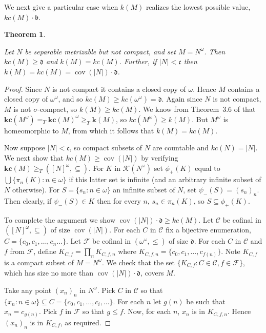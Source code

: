 \documentclass{article}
\newtheorem{thm}{Theorem}[section]
\newcommand{\tq}{\ge_T}
\newcommand{\te}{=_T}
\newcommand{\K}{\mathcal{K}}
\begin{document}
We next give a particular case when $k(M)$ realizes the lowest possible value, $kc(M)\cdot\mathfrak{b}$. 
\begin{thm}\label{th:powers} 

    Let $N$ be separable metrizable but not compact, and set $M=N^\omega$. Then $kc(M) \ge \mathfrak{d}$ and $k(M)=kc(M)$.     
    Further, if $|N|<\mathfrak{c}$ then $k(M)=kc(M)=\mathop{cov}(|N|)\cdot \mathfrak{d}$. 
\end{thm}
\begin{proof} 
    Since $N$ is not compact it contains a closed copy of $\omega$. Hence $M$ contains a closed copy of $\omega^\omega$, and so $kc(M) \ge kc(\omega^\omega)=\mathfrak{d}$. 
Again since $N$ is not compact, $M$ is not $\sigma$-compact, so $k(M) \ge kc(M)$. 
    We know from Theorem~3.6 of \cite{FG_Shape} that $\mathbf{kc}(M^\omega)\te\mathbf{kc}(M)^\omega \tq \mathbf{k}(M)$, so $kc(M^\omega) \ge k(M)$. 
    But $M^\omega$ is homeomorphic to $M$, from which it follows that $k(M)=kc(M)$. 


    Now suppose $|N|<\mathfrak{c}$, so compact subsets of $N$ are countable and $kc(N)=|N|$. We next show that $kc(M) \ge \mathop{cov}(|N|)$ by verifying $\textbf{kc}(M) \tq ([N]^\omega,\subseteq)$. 
    For $K$ in $\K(N^\omega)$ set $\phi_+(K)$ equal to $\bigcup \{ \pi_n(K) : n \in \omega\}$ if this latter set is infinite (and an arbitrary infinite subset of $N$ otherwise). 
    For $S=\{s_n : n \in \omega\}$ an infinite subset of $N$, set  $\psi_-(S)=(s_n)_n$. Then clearly, if $\psi_-(S) \in K$ then for every $n$, $s_n \in \pi_n(K)$, so $S \subseteq \phi_+(K)$. 

    To complete the argument we show $\mathop{cov}(|N|)\cdot\mathfrak{d} \ge kc(M)$. Let $\mathcal{C}$ be cofinal in $([N]^\omega,\subseteq)$ of size $\mathop{cov}(|N|)$. For each $C$ in $\mathcal{C}$ fix a bijective enumeration, $C=\{c_0,c_1,\ldots, c_n\ldots\}$. 
    Let $\mathcal{F}$ be cofinal in $(\omega^\omega,\le)$ of size $\mathfrak{d}$. 
    For each $C$ in $\mathcal{C}$ and $f$ from $\mathcal{F}$, define $K_{C,f}=\prod_n K_{C,f,n}$ where $K_{C,f,n}=\{c_0,c_1,\ldots,c_{f(n)}\}$. Note $K_{C,f}$ is a compact subset of $M=N^\omega$. 
    We check that the set $\{K_{C,f} : C \in \mathcal{C}, f \in \mathcal{F}\}$, which has size no more than $\mathop{cov}(|N|)\cdot\mathfrak{d}$, covers $M$. 

    Take any point $(x_n)_n$ in $N^\omega$. 
    Pick $C$ in $\mathcal{C}$ so that $\{x_n : n \in \omega\} \subseteq C=\{c_0,c_1,\ldots,c_i,\ldots\}$. For each $n$ let $g(n)$ be such that $x_n=c_{g(n)}$. Pick $f$ in $\mathcal{F}$ so that $g \le f$. Now, for each $n$, $x_n$ is in $K_{C,f,n}$. Hence $(x_n)_n$ is in $K_{C,f}$, as required. 
\end{proof}
\end{document}
